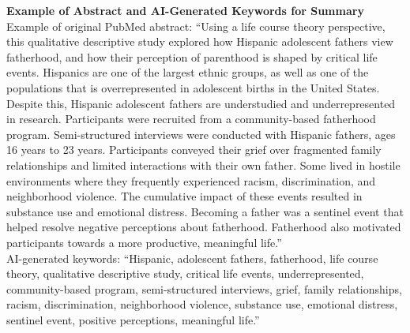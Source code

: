\textbf{Example of Abstract and AI-Generated Keywords for Summary} \\

Example of original PubMed abstract: ``Using a life course theory perspective, this qualitative descriptive study explored how Hispanic adolescent fathers view fatherhood, and how their perception of parenthood is shaped by critical life events. Hispanics are one of the largest ethnic groups, as well as one of the populations that is overrepresented in adolescent births in the United States. Despite this, Hispanic adolescent fathers are understudied and underrepresented in research. Participants were recruited from a community-based fatherhood program. Semi-structured interviews were conducted with Hispanic fathers, ages 16 years to 23 years. Participants conveyed their grief over fragmented family relationships and limited interactions with their own father. Some lived in hostile environments where they frequently experienced racism, discrimination, and neighborhood violence. The cumulative impact of these events resulted in substance use and emotional distress. Becoming a father was a sentinel event that helped resolve negative perceptions about fatherhood. Fatherhood also motivated participants towards a more productive, meaningful life.'' \\

\noindent AI-generated keywords: ``Hispanic, adolescent fathers, fatherhood, life course theory, qualitative descriptive study, critical life events, underrepresented, community-based program, semi-structured interviews, grief, family relationships, racism, discrimination, neighborhood violence, substance use, emotional distress, sentinel event, positive perceptions, meaningful life.''
